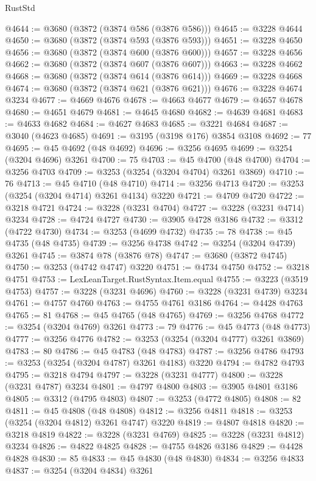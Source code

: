\begin{lexlean}{RustStd}
\begin{coremodule}
@4644 := @3680 (@3872 (@3874 @586 (@3876 @586)))
@4645 := @3228 @4644
@4650 := @3680 (@3872 (@3874 @593 (@3876 @593)))
@4651 := @3228 @4650
@4656 := @3680 (@3872 (@3874 @600 (@3876 @600)))
@4657 := @3228 @4656
@4662 := @3680 (@3872 (@3874 @607 (@3876 @607)))
@4663 := @3228 @4662
@4668 := @3680 (@3872 (@3874 @614 (@3876 @614)))
@4669 := @3228 @4668
@4674 := @3680 (@3872 (@3874 @621 (@3876 @621)))
@4676 := @3228 @4674 @3234
@4677 := @4669 @4676
@4678 := @4663 @4677
@4679 := @4657 @4678
@4680 := @4651 @4679
@4681 := @4645 @4680
@4682 := @4639 @4681
@4683 := @4633 @4682
@4684 := @4627 @4683
@4685 := @3221 @4684
@4687 := @3040 (@4623 @4685)
@4691 := @3195 (@3198 @176) @3854 @3108
@4692 := 77
@4695 := @45 @4692 (@48 @4692)
@4696 := @3256 @4695
@4699 := @3254 (@3204 @4696) @3261
@4700 := 75
@4703 := @45 @4700 (@48 @4700)
@4704 := @3256 @4703
@4709 := @3253 (@3254 (@3204 @4704) @3261 @3869)
@4710 := 76
@4713 := @45 @4710 (@48 @4710)
@4714 := @3256 @4713
@4720 := @3253 (@3254 (@3204 @4714) @3261 @4134) @3220
@4721 := @4709 @4720
@4722 := @3218 @4721
@4724 := @3228 (@3231 @4704)
@4727 := @3228 (@3231 @4714) @3234
@4728 := @4724 @4727
@4730 := @3905 @4728 @3186
@4732 := @3312 (@4722 @4730)
@4734 := @3253 (@4699 @4732)
@4735 := 78
@4738 := @45 @4735 (@48 @4735)
@4739 := @3256 @4738
@4742 := @3254 (@3204 @4739) @3261
@4745 := @3874 @78 (@3876 @78)
@4747 := @3680 (@3872 @4745)
@4750 := @3253 (@4742 @4747) @3220
@4751 := @4734 @4750
@4752 := @3218 @4751
@4753 := LexLeanTarget.RustSyntax.Item.equal
@4755 := @3223 (@3519 @4753)
@4757 := @3228 (@3231 @4696)
@4760 := @3228 (@3231 @4739) @3234
@4761 := @4757 @4760
@4763 := @4755 @4761 @3186
@4764 := @4428 @4763
@4765 := 81
@4768 := @45 @4765 (@48 @4765)
@4769 := @3256 @4768
@4772 := @3254 (@3204 @4769) @3261
@4773 := 79
@4776 := @45 @4773 (@48 @4773)
@4777 := @3256 @4776
@4782 := @3253 (@3254 (@3204 @4777) @3261 @3869)
@4783 := 80
@4786 := @45 @4783 (@48 @4783)
@4787 := @3256 @4786
@4793 := @3253 (@3254 (@3204 @4787) @3261 @4183) @3220
@4794 := @4782 @4793
@4795 := @3218 @4794
@4797 := @3228 (@3231 @4777)
@4800 := @3228 (@3231 @4787) @3234
@4801 := @4797 @4800
@4803 := @3905 @4801 @3186
@4805 := @3312 (@4795 @4803)
@4807 := @3253 (@4772 @4805)
@4808 := 82
@4811 := @45 @4808 (@48 @4808)
@4812 := @3256 @4811
@4818 := @3253 (@3254 (@3204 @4812) @3261 @4747) @3220
@4819 := @4807 @4818
@4820 := @3218 @4819
@4822 := @3228 (@3231 @4769)
@4825 := @3228 (@3231 @4812) @3234
@4826 := @4822 @4825
@4828 := @4755 @4826 @3186
@4829 := @4428 @4828
@4830 := 85
@4833 := @45 @4830 (@48 @4830)
@4834 := @3256 @4833
@4837 := @3254 (@3204 @4834) @3261

\end{coremodule}
\end{lexlean}
